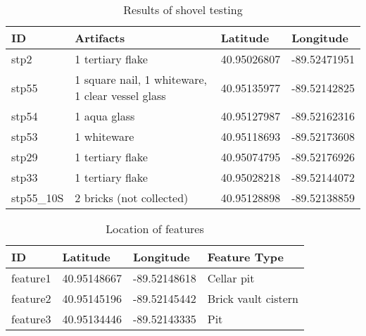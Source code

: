 \pagebreak

\begin{table}[]
\centering
\caption{Results of shovel testing}
\label{table_2}
\begin{tabular}{llll}
	\hline
	ID         & Artifacts                                        & Latitude    & Longitude    \\ \hline
	stp2       & 1 tertiary flake                                 & 40.95026807 & -89.52471951 \\
	stp55      & 1 square nail, 1 whiteware, 1 clear vessel glass & 40.95135977 & -89.52142825 \\
	stp54      & 1 aqua glass                                     & 40.95127987 & -89.52162316 \\
	stp53      & 1 whiteware                                      & 40.95118693 & -89.52173608 \\
	stp29      & 1 tertiary flake                                 & 40.95074795 & -89.52176926 \\
	stp33      & 1 tertiary flake                                 & 40.95028218 & -89.52144072 \\
	stp55\_10S & 2 bricks (not collected)                         & 40.95128898 & -89.52138859 \\ \hline
\end{tabular}
\end{table}

\begin{table}[]
\centering
\caption{Location of features}
\label{table_3}
\begin{tabular}{llll}
	\hline
	ID       & Latitude    & Longitude    & Feature Type        \\ \hline
	feature1 & 40.95148667 & -89.52148618 & Cellar pit          \\
	feature2 & 40.95145196 & -89.52145442 & Brick vault cistern \\
	feature3 & 40.95134446 & -89.52143335 & Pit                 \\ \hline
\end{tabular}
\end{table}


\IJSRAclosing
